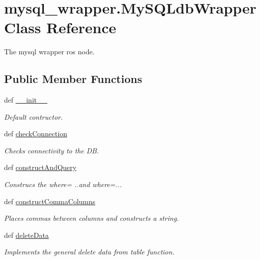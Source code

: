 \hypertarget{classmysql__wrapper_1_1MySQLdbWrapper}{\section{mysql\-\_\-wrapper.\-My\-S\-Q\-Ldb\-Wrapper Class Reference}
\label{classmysql__wrapper_1_1MySQLdbWrapper}
}


The mysql wrapper ros node.  


\subsection*{Public Member Functions}
\begin{DoxyCompactItemize}
\item 
def \hyperlink{classmysql__wrapper_1_1MySQLdbWrapper_a2b6fd40da2a2f542b28b36ce0f1a934e}{\-\_\-\-\_\-init\-\_\-\-\_\-}
\begin{DoxyCompactList}\small\item\em Default contructor. \end{DoxyCompactList}\item 
def \hyperlink{classmysql__wrapper_1_1MySQLdbWrapper_a799119b4e8ddbe43c6e6104a24e00810}{check\-Connection}
\begin{DoxyCompactList}\small\item\em Checks connectivity to the D\-B. \end{DoxyCompactList}\item 
def \hyperlink{classmysql__wrapper_1_1MySQLdbWrapper_ab4f7188d6ce504d7d85aecfa530139d8}{construct\-And\-Query}
\begin{DoxyCompactList}\small\item\em Construcs the where= ..and where=... \end{DoxyCompactList}\item 
def \hyperlink{classmysql__wrapper_1_1MySQLdbWrapper_a200a1c8aece87564e6c946175d67a6ae}{construct\-Comma\-Columns}
\begin{DoxyCompactList}\small\item\em Places commas between columns and constructs a string. \end{DoxyCompactList}\item 
def \hyperlink{classmysql__wrapper_1_1MySQLdbWrapper_af38d17b27861ac7d262666d4b32c84f3}{delete\-Data}
\begin{DoxyCompactList}\small\item\em Implements the general delete data from table function. \end{DoxyCompactList}\item 

\end{DoxyCompactItemize}
